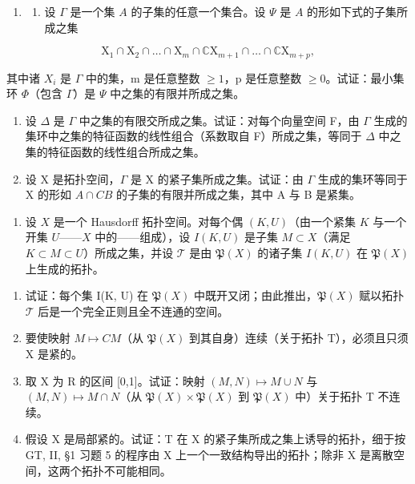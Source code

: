 \begin{enumerate}
\def\labelenumi{\arabic{enumi})}
\setcounter{enumi}{10}
\tightlist
\item
  \begin{enumerate}
  \def\labelenumii{\alph{enumii})}
  \tightlist
  \item
    设 \(\Gamma\) 是一个集 \(A\) 的子集的任意一个集合。设 \(\Psi\) 是 \(A\) 的形如下式的子集所成之集
  \end{enumerate}
\end{enumerate}

\[
\mathrm{X} _ {1} \cap \mathrm{X} _ {2} \cap \dots \cap \mathrm{X} _ {m} \cap \mathbb {C} \mathrm{X} _ {m + 1} \cap \dots \cap \mathbb {C} \mathrm{X} _ {m + p},
\]

其中诸 \(X_{i}\) 是 \(\Gamma\) 中的集，m 是任意整数 \(\geqslant 1\)，p 是任意整数 \(\geqslant 0\)。试证：最小集环 \(\Phi\)（包含 \(\Gamma\)）是 \(\Psi\) 中之集的有限并所成之集。

\begin{enumerate}
\def\labelenumi{\alph{enumi})}
\setcounter{enumi}{1}
\item
  设 \(\Delta\) 是 \(\Gamma\) 中之集的有限交所成之集。试证：对每个向量空间 F，由 \(\Gamma\) 生成的集环中之集的特征函数的线性组合（系数取自 F）所成之集，等同于 \(\Delta\) 中之集的特征函数的线性组合所成之集。
\item
  设 X 是拓扑空间，\(\Gamma\) 是 X 的紧子集所成之集。试证：由 \(\Gamma\) 生成的集环等同于 X 的形如 \(A \cap CB\) 的子集的有限并所成之集，其中 A 与 B 是紧集。
\end{enumerate}

\begin{enumerate}
\def\labelenumi{\arabic{enumi})}
\setcounter{enumi}{11}
\tightlist
\item
  设 \(X\) 是一个 Hausdorff 拓扑空间。对每个偶 \((K, U)\)（由一个紧集 \(K\) 与一个开集 \(U\)——\(X\) 中的——组成），设 \(I(K, U)\) 是子集 \(M \subset X\)（满足 \(K \subset M \subset U\)）所成之集，并设 \(\mathcal{T}\) 是由 \(\mathfrak{P}(X)\) 的诸子集 \(I(K, U)\) 在 \(\mathfrak{P}(X)\) 上生成的拓扑。
\end{enumerate}

\begin{enumerate}
\def\labelenumi{\alph{enumi})}
\item
  试证：每个集 I(K, U) 在 \(\mathfrak{P}(X)\) 中既开又闭；由此推出，\(\mathfrak{P}(X)\) 赋以拓扑 \(\mathcal{T}\) 后是一个完全正则且全不连通的空间。
\item
  要使映射 \(M \mapsto CM\)（从 \(\mathfrak{P}(X)\) 到其自身）连续（关于拓扑 T），必须且只须 X 是紧的。
\item
  取 X 为 R 的区间 {[}0,1{]}。试证：映射 \((M,N)\mapsto M\cup N\) 与 \((M,N)\mapsto M\cap N\)（从 \(\mathfrak{P}(X)\times\mathfrak{P}(X)\) 到 \(\mathfrak{P}(X)\) 中）关于拓扑 T 不连续。
\item
  假设 X 是局部紧的。试证：T 在 X 的紧子集所成之集上诱导的拓扑，细于按 GT, II, §1 习题 5 的程序由 X 上一个一致结构导出的拓扑；除非 X 是离散空间，这两个拓扑不可能相同。
\end{enumerate}

